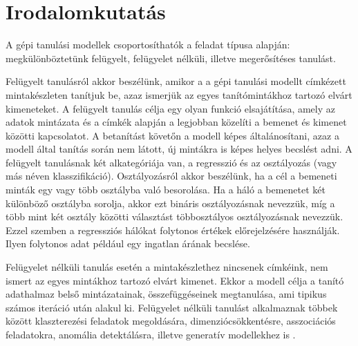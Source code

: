 \section{Irodalomkutatás}
\label{sec:irodalom}



A gépi tanulási modellek csoportosíthatók a feladat típusa alapján: megkülönböztetünk felügyelt, felügyelet nélküli, illetve megerősítéses tanulást.


Felügyelt tanulásról akkor beszélünk, amikor a a gépi tanulási modellt címkézett mintakészleten tanítjuk be, azaz ismerjük az egyes tanítómintákhoz tartozó elvárt kimeneteket. A felügyelt tanulás célja egy olyan funkció elsajátítása, amely az adatok mintázata és a címkék alapján a legjobban közelíti a bemenet és kimenet közötti kapcsolatot. A betanítást követőn a modell képes általánosítani, azaz a modell által tanítás során nem látott, új mintákra is képes helyes becslést adni. A felügyelt tanulásnak két alkategóriája van, a regresszió és az osztályozás (vagy más néven klasszifikáció). Osztályozásról akkor beszélünk, ha a cél a bemeneti minták egy vagy több osztályba való besorolása. Ha a háló a bemenetet két különböző osztályba sorolja, akkor ezt bináris osztályozásnak nevezzük, míg a több mint két osztály közötti választást többosztályos osztályozásnak nevezzük. Ezzel szemben a regressziós hálókat folytonos értékek előrejelzésére használják. Ilyen folytonos adat például egy ingatlan árának becslése. 

Felügyelet nélküli tanulás esetén a mintakészlethez nincsenek címkéink, nem ismert az egyes mintákhoz tartozó elvárt kimenet. Ekkor a modell célja a tanító adathalmaz belső mintázatainak, összefüggéseinek megtanulása, ami tipikus számos iteráció után alakul ki. Felügyelet nélküli tanulást alkalmaznak többek között klaszterezési feladatok megoldására, dimenziócsökkentésre, asszociációs feladatokra, anomália detektálásra, illetve generatív modellekhez is \cite{ghahramani2003unsupervised}.

